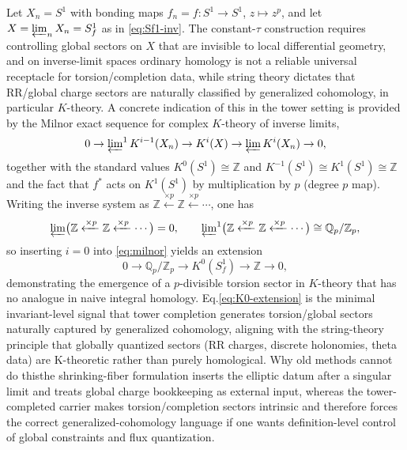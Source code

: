 \documentclass[11pt]{article}
\theoremstyle{remark}
\newcommand{\Z}{\mathbb{Z}}
\newcommand{\Q}{\mathbb{Q}}
\begin{document}
Let \(X_n=S^{1}\) with bonding maps \(f_n=f:S^{1}\to S^{1}\), \(z\mapsto z^{p}\), and let \(X=\varprojlim_n X_n=S_f^{1}\) as in \eqref{eq:Sf1-inv}. The constant-\(\tau\) construction requires controlling global sectors on \(X\) that are invisible to local differential geometry, and on inverse-limit spaces ordinary homology is not a reliable universal receptacle for torsion/completion data, while string theory dictates that RR/global charge sectors are naturally classified by generalized cohomology, in particular \(K\)-theory. A concrete indication of this in the tower setting is provided by the Milnor exact sequence for complex \(K\)-theory of inverse limits,
\begin{equation}\label{eq:milnor}
0\to \varprojlim\nolimits^{1}K^{i-1}(X_n)\to K^{i}(X)\to \varprojlim K^{i}(X_n)\to 0,
\end{equation}
together with the standard values \(K^{0}(S^{1})\cong \Z\) and \(K^{-1}(S^{1})\cong K^{1}(S^{1})\cong \Z\) and the fact that \(f^{*}\) acts on \(K^{1}(S^{1})\) by multiplication by \(p\) (degree \(p\) map). Writing the inverse system as \(\Z\xleftarrow{\times p}\Z\xleftarrow{\times p}\cdots\), one has
\begin{equation}\label{eq:lim-lim1}
\varprojlim\bigl(\Z\xleftarrow{\times p}\Z\xleftarrow{\times p}\cdots\bigr)=0,\qquad \varprojlim\nolimits^{1}\bigl(\Z\xleftarrow{\times p}\Z\xleftarrow{\times p}\cdots\bigr)\cong \Q_{p}/\Z_{p},
\end{equation}
so inserting \(i=0\) into \eqref{eq:milnor} yields an extension
\begin{equation}\label{eq:K0-extension}
0\to \Q_{p}/\Z_{p}\to K^{0}(S_f^{1})\to \Z\to 0,
\end{equation}
demonstrating the emergence of a \(p\)-divisible torsion sector in \(K\)-theory that has no analogue in naive integral homology. Eq.\eqref{eq:K0-extension} is the minimal invariant-level signal that tower completion generates torsion/global sectors naturally captured by generalized cohomology, aligning with the string-theory principle that globally quantized sectors (RR charges, discrete holonomies, theta data) are K-theoretic rather than purely homological. Why old methods cannot do this\:the shrinking-fiber formulation inserts the elliptic datum after a singular limit and treats global charge bookkeeping as external input, whereas the tower-completed carrier makes torsion/completion sectors intrinsic and therefore forces the correct generalized-cohomology language if one wants definition-level control of global constraints and flux quantization. 
\end{document}
